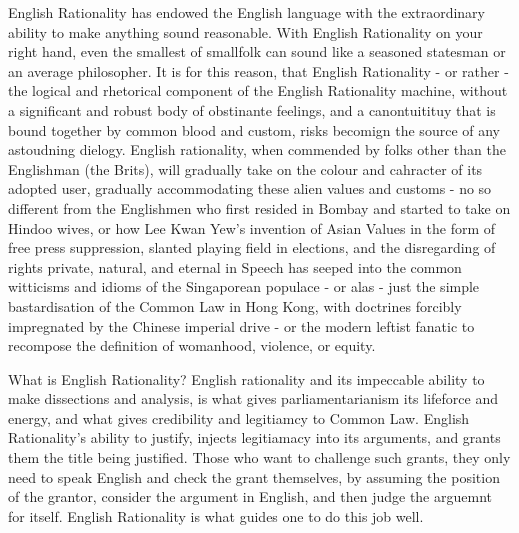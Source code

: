 \separator
English Rationality has endowed the English language with the extraordinary ability to make anything sound reasonable. With English Rationality on your right hand, even the smallest of smallfolk can sound like a seasoned statesman or an average philosopher. It is for this reason, that English Rationality - or rather - the logical and rhetorical component of the English Rationality machine, without a significant and robust body of obstinante feelings, and a canontuitituy that is bound together by common blood and custom, risks becomign the source of any astoudning dielogy. English rationality, when commended by folks other than the Englishman (the Brits), will gradually take on the colour and cahracter of its adopted user, gradually accommodating these alien values and customs - no so different from the Englishmen who first resided in Bombay and started to take on Hindoo wives, or how Lee Kwan Yew's invention of Asian Values in the form of free press suppression, slanted playing field in elections, and the disregarding of rights private, natural, and eternal in Speech has seeped into the common witticisms and idioms of the Singaporean populace - or alas - just the simple bastardisation of the Common Law in Hong Kong, with doctrines forcibly impregnated by the Chinese imperial drive - or the modern leftist fanatic to recompose the definition of womanhood, violence, or equity.


\separator

What is English Rationality? English rationality and its impeccable ability to make dissections and analysis, is what gives parliamentarianism its lifeforce and energy, and what gives credibility and legitiamcy to Common Law. English Rationality's ability to justify, injects legitiamacy into its arguments, and grants them the title being justified. Those who want to challenge such grants, they only need to speak English and check the grant themselves, by assuming the position of the grantor, consider the argument in English, and then judge the arguemnt for itself. English Rationality is what guides one to do this job well.





